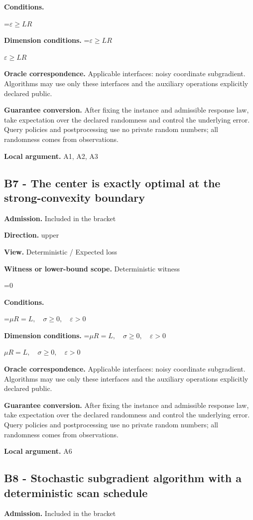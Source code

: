 \documentclass[10pt,a4paper]{article}
\newcommand{\AtlasMath}[1]{\par\begingroup\centering\setbox0=\hbox{$\displaystyle #1$}\ifdim\wd0>1.4\linewidth\typeout{ATLAS WIDE FORMULA: \the\wd0}\fi\ifdim\wd0>\linewidth\resizebox{\linewidth}{!}{\box0}\else\box0\fi\par\endgroup}
\newcommand{\AtlasInlineMath}[1]{\begingroup\setbox0=\hbox{$#1$}\ifdim\wd0>.4\linewidth\endgroup\AtlasMath{#1}\else\endgroup$#1$\fi}
\begin{document}
\textbf{Conditions.} 
\AtlasMath{\varepsilon\ge LR}


\textbf{Dimension conditions.} \AtlasInlineMath{\varepsilon\ge LR}

\textbf{Oracle correspondence.} Applicable interfaces: noisy coordinate subgradient. Algorithms may use only these interfaces and the auxiliary operations explicitly declared public.

\textbf{Guarantee conversion.} After fixing the instance and admissible response law, take expectation over the declared randomness and control the underlying error. Query policies and postprocessing use no private random numbers; all randomness comes from observations.

\textbf{Local argument.} A1, A2, A3

\subsection{B7 - The center is exactly optimal at the strong-convexity boundary}
\textbf{Admission.} Included in the bracket

\textbf{Direction.} upper

\textbf{View.} Deterministic / Expected loss

\textbf{Witness or lower-bound scope.} Deterministic witness

\AtlasMath{0}
\textbf{Conditions.} 
\AtlasMath{\mu R=L,\quad\sigma\ge0,\quad\varepsilon>0}


\textbf{Dimension conditions.} \AtlasInlineMath{\mu R=L,\quad\sigma\ge0,\quad\varepsilon>0}

\textbf{Oracle correspondence.} Applicable interfaces: noisy coordinate subgradient. Algorithms may use only these interfaces and the auxiliary operations explicitly declared public.

\textbf{Guarantee conversion.} After fixing the instance and admissible response law, take expectation over the declared randomness and control the underlying error. Query policies and postprocessing use no private random numbers; all randomness comes from observations.

\textbf{Local argument.} A6

\subsection{B8 - Stochastic subgradient algorithm with a deterministic scan schedule}
\textbf{Admission.} Included in the bracket
\end{document}
